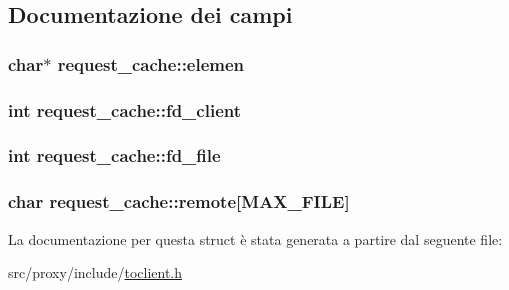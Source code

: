 \subsection{Documentazione dei campi}
\hypertarget{structrequest__cache_a59234fac7de2e701b706493c82ca1dcc}{
\subsubsection[{elemen}]{\setlength{\rightskip}{0pt plus 5cm}char$\ast$ {\bf request\_\-cache::elemen}}}
\label{structrequest__cache_a59234fac7de2e701b706493c82ca1dcc}
\hypertarget{structrequest__cache_ab27cbab9f719741ae489f4430e7da682}{
\subsubsection[{fd\_\-client}]{\setlength{\rightskip}{0pt plus 5cm}int {\bf request\_\-cache::fd\_\-client}}}
\label{structrequest__cache_ab27cbab9f719741ae489f4430e7da682}
\hypertarget{structrequest__cache_aaf09572743c4a2b54d890e4b84a29e8b}{
\subsubsection[{fd\_\-file}]{\setlength{\rightskip}{0pt plus 5cm}int {\bf request\_\-cache::fd\_\-file}}}
\label{structrequest__cache_aaf09572743c4a2b54d890e4b84a29e8b}
\hypertarget{structrequest__cache_a7fe39e9d4981bcb775ecf23bb7197271}{
\subsubsection[{remote}]{\setlength{\rightskip}{0pt plus 5cm}char {\bf request\_\-cache::remote}\mbox{[}MAX\_\-FILE\mbox{]}}}
\label{structrequest__cache_a7fe39e9d4981bcb775ecf23bb7197271}


La documentazione per questa struct è stata generata a partire dal seguente file:\begin{DoxyCompactItemize}
\item 
src/proxy/include/\hyperlink{toclient_8h}{toclient.h}\end{DoxyCompactItemize}
